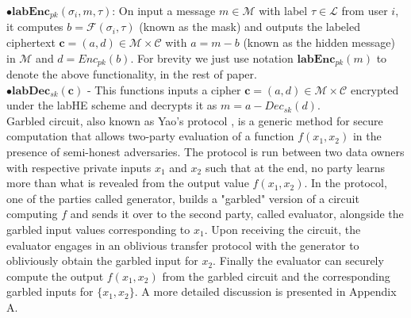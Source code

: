 $\bullet \textbf{labEnc}_{pk}(\sigma_i, m , \tau)$: On input a message $m \in \mathcal{M} $ with label $\tau \in \mathcal{L}$  from user $i$, it computes $b=\mathcal{F}(\sigma_i, \tau)$ (known as the mask) and outputs the labeled ciphertext $\mathbf{c}=(a,d) \in \mathcal{M} \times \mathcal{C}$ with $ a= m- b$  (known as the hidden message) in $\mathcal{M}$ and $d=Enc_{pk}(b)$. For brevity we just use notation $\textbf{labEnc}_{pk}(m)$ to denote the above functionality, in the rest of paper. \\
$\bullet \textbf{labDec}_{sk}(\mathbf{c})$ - This functions inputs a cipher $\mathbf{c}=(a,d) \in \mathcal{M} \times \mathcal{C}$ encrypted under the labHE scheme and decrypts it as $m=a-Dec_{sk}(d)$.\\
Garbled circuit, also known as Yao's protocol \cite{Yao,yao2},  is a generic method for secure  computation that allows two-party evaluation of a function $f(x_1,x_2)$ in the presence of semi-honest adversaries. The protocol is run between two data owners with respective private inputs $x_1$ and $x_2$ such that at the end, no party learns more  
than what is revealed from the output value $f(x_1,x_2)$.  In the protocol, one of the parties called
generator, builds a "garbled" version of a circuit computing $f$ and sends it over to the second party, called evaluator, alongside the garbled input values 
corresponding to $x_1$.  Upon receiving the circuit, the evaluator 
engages in an oblivious transfer protocol with the generator to obliviously obtain the garbled input for $x_2$. Finally the evaluator can securely compute the  output $f(x_1, x_2)$ from the garbled circuit and the corresponding garbled inputs for $\{x_1,x_2\}$.
A more detailed discussion is presented in Appendix A.
